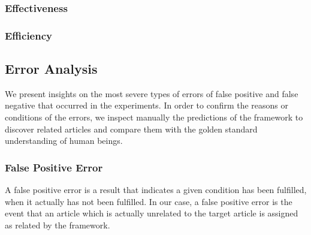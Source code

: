 \subsubsection{Effectiveness}

\subsubsection{Efficiency}

\subsection{Error Analysis}
\label{sec:5.5}

We present insights on the most severe types of errors of false positive and false negative that occurred in the experiments. In order to confirm the reasons or conditions of the errors, we inspect manually the predictions of the framework to discover related articles and compare them with the golden standard understanding of human beings.  

\subsubsection{False Positive Error}

A false positive error is a result that indicates a given condition has been fulfilled, when it actually has not been fulfilled. In our case, a false positive error is the event that an article which is actually unrelated to the target article is assigned as related by the framework. 

